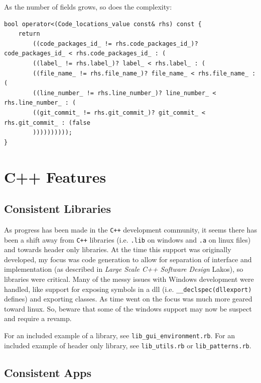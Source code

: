 \documentclass[11pt]{article}
\begin{document}
   As the number of fields grows, so does the complexity:

\lstset{language=C++}
\begin{lstlisting}
bool operator<(Code_locations_value const& rhs) const {
    return
        ((code_packages_id_ != rhs.code_packages_id_)? code_packages_id_ < rhs.code_packages_id_ : (
        ((label_ != rhs.label_)? label_ < rhs.label_ : (
        ((file_name_ != rhs.file_name_)? file_name_ < rhs.file_name_ : (
        ((line_number_ != rhs.line_number_)? line_number_ < rhs.line_number_ : (
        ((git_commit_ != rhs.git_commit_)? git_commit_ < rhs.git_commit_ : (false
        ))))))))));
}
\end{lstlisting}



\section{C++ Features}
\label{sec-6}

\subsection{Consistent Libraries}
\label{sec-6.1}

   
   As progress has been made in the \texttt{C++} development community, it
   seems there has been a shift away from \texttt{C++} libraries (i.e. \texttt{.lib}
   on windows and \texttt{.a} on linux files) and towards header only
   libraries. At the time this support was originally developed, my
   focus was code generation to allow for separation of interface and
   implementation (as described in \emph{Large Scale C++ Software Design}
   Lakos), so libraries were critical. Many of the messy issues with
   Windows development were handled, like support for exposing symbols
   in a dll (i.e. \texttt{\_\_declspec(dllexport)} defines) and exporting
   classes. As time went on the focus was much more geared toward
   linux. So, beware that some of the windows support may now be
   suspect and require a revamp.

   
   For an included example of a library, see
   \texttt{lib\_gui\_environment.rb}. For an included example of header only
   library, see \texttt{lib\_utils.rb} or \texttt{lib\_patterns.rb}.


\subsection{Consistent Apps}
\label{sec-6.2}
\end{document}
